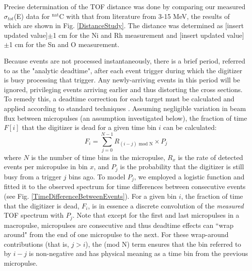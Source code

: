 \documentclass[twocolumn,secnumarabic,amssymb, nobibnotes, aps, prl,
superscriptaddress, nobalancelastpage]{revtex4}
\newcommand{\totEs}{\ensuremath{\sigma_{tot}}(E)\,\,}
\begin{document}
Precise determination of the TOF distance was done by comparing our measured \totEs data
for $^{\text{nat}}$C with that from literature from 3-15 MeV, the results of which are
shown in Fig. \ref{DistanceStudy}. The distance was determined as [insert
updated value]$\pm$1 cm for the Ni and Rh measurement and [insert updated value]$\pm$1 cm 
for the Sn and O measurement.

Because events are not processed instantaneously, there is a brief period,
referred to as the "analytic deadtime", after each event trigger during which
the digitizer is busy processing that trigger. Any newly-arriving events in this
period will be ignored, privileging events arriving earlier and thus distorting
the cross sections. To remedy this, a deadtime correction for
each target must be calculated and applied according to standard techniques
\cite{Moore1980}. Assuming negligible variation in beam flux between micropulses
(an assumption investigated below), the fraction of time $F[i]$ that the digitizer is dead 
for a given time bin $i$ can be calculated:
\begin{equation}
    F_{i} = \sum^{N-1}_{j=0} R_{(i-j)\text{ mod N}}\times P_{j}
\end{equation}
where $N$ is the number of time bins in the micropulse, $R_{x}$ is the rate of
detected events per micropulse in bin $x$, and $P_{j}$ is the probability that the
digitizer is still busy from a trigger $j$ bins ago. To model $P_{j}$, we
employed a logistic function and fitted it to the observed spectrum for time
differences between consecutive events (see Fig.
\ref{TimeDifferenceBetweenEvents}). For a given bin $i$, the fraction of time that the 
digitizer is dead, $F_{i}$, is in essence a discrete convolution of the
\textit{measured} TOF spectrum with $P_{j}$. Note that except for the first and
last micropulses in a macropulse, micropulses are consecutive and thus deadtime effects can
``wrap around" from the end of one micropulse to the next. For these wrap-around
contributions (that is, $j>i$), the (mod N) term ensures that the bin referred
to by $i-j$ is non-negative and has physical meaning as a time bin from the previous 
micropulse.
\end{document}
